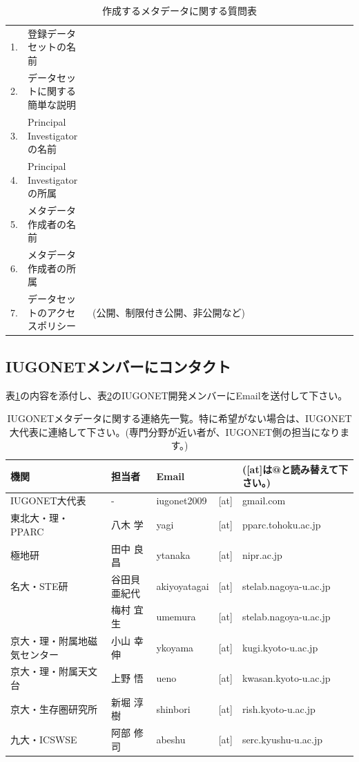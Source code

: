 \begin{table}[H]
\begin{center}
\caption{作成するメタデータに関する質問表}
\label{initial}
\begin{tabular}{ll|l}\hline
1. & 登録データセットの名前 & \ \ \ \ \ \ \ \ \ \ \ \ \ \ \ \ \ \ \ \ \ \ \ \ \ \ \ \ \ \ \ \ \ \ \ \ \ \ \ \ \ \ \ \ \ \ \ \ \ \ \ \ \ \\
2. & データセットに関する簡単な説明 & \\
3. & Principal Investigatorの名前 & \\
4. & Principal Investigatorの所属 & \\
5. & メタデータ作成者の名前 & \\
6. & メタデータ作成者の所属 & \\
7. & データセットのアクセスポリシー & (公開、制限付き公開、非公開など) \\ \hline
\end{tabular}
\end{center}
\end{table}

\subsection{IUGONETメンバーにコンタクト}\label{contact}
表\ref{initial}の内容を添付し、表\ref{contact}のIUGONET開発メンバーにEmailを送付して下さい。

\begin{table}[H]
\begin{center}
\caption{IUGONETメタデータに関する連絡先一覧。特に希望がない場合は、IUGONET大代表に連絡して下さい。(専門分野が近い者が、IUGONET側の担当になります。)}
\label{contact}
\begin{tabular}{lllll}\hline
機関 & 担当者 & Email& & ([at]は@と読み替えて下さい。)\\ \hline
\cellcolor[gray]{0.9}IUGONET大代表 & \cellcolor[gray]{0.9}- & \cellcolor[gray]{0.9}iugonet2009 & \cellcolor[gray]{0.9}[at] & \cellcolor[gray]{0.9}gmail.com\\ 
東北大・理・PPARC & 八木 学 & yagi & [at] & pparc.tohoku.ac.jp\\
極地研 & 田中 良昌 & ytanaka & [at] & nipr.ac.jp\\
名大・STE研 & 谷田貝 亜紀代 & akiyoyatagai & [at] & stelab.nagoya-u.ac.jp\\
 & 梅村 宜生 & umemura & [at] & stelab.nagoya-u.ac.jp\\
京大・理・附属地磁気センター & 小山 幸伸 & ykoyama & [at] & kugi.kyoto-u.ac.jp\\
京大・理・附属天文台 & 上野 悟 & ueno & [at] & kwasan.kyoto-u.ac.jp\\
京大・生存圏研究所 & 新堀 淳樹 & shinbori & [at] & rish.kyoto-u.ac.jp\\
九大・ICSWSE & 阿部 修司 & abeshu & [at] & serc.kyushu-u.ac.jp\\ \hline
\end{tabular}
\end{center}
\end{table}

